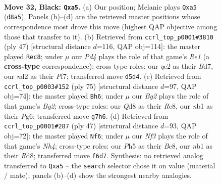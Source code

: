 \documentclass[11pt]{article}
\begin{document}
\clearpage

\begin{figure}[p]\centering
\begin{subfigure}{0.46\textwidth}\centering
\resizebox{\linewidth}{!}{%
\newchessgame
\chessboard[
  setfen={r1bq1r2/pp3pbk/n4np1/P2pP1Bp/B5PP/1P6/R1PNQP2/1N2R1K1 b - - 0 32},
  showmover=false,
  pgfstyle=straightmove, color=movearrow, markmove={d8-a5}
]}
\caption{}
\end{subfigure}\hfill
\begin{subfigure}{0.46\textwidth}\centering
\resizebox{\linewidth}{!}{%
\newchessgame
\chessboard[
  setfen={r3r1k1/3bqpp1/pb1p1n2/1p1P2B1/P1nNP2p/5P1P/2B1N1P1/R2Q1R1K b - - 1 24},
  showmover=false,
  pgfstyle=straightmove, color=movearrow, markmove={e8-c8}
]}
\caption{}
\end{subfigure}
\\[4pt]
\begin{subfigure}{0.46\textwidth}\centering
\resizebox{\linewidth}{!}{%
\newchessgame
\chessboard[
  setfen={r1r3k1/1p1bqpb1/3p1np1/pNnP3p/P1RN4/6PP/2Q1PPB1/1R2B1K1 b - - 9 38},
  showmover=false,
  pgfstyle=straightmove, color=movearrow, markmove={g7-h6}
]}
\caption{}
\end{subfigure}\hfill
\begin{subfigure}{0.46\textwidth}\centering
\resizebox{\linewidth}{!}{%
\newchessgame
\chessboard[
  setfen={2br1r1k/2p1b1pp/7q/p1P1pP1n/1p3nP1/4BN1P/PPQN1P1K/R4B1R b - - 0 24},
  showmover=false,
  pgfstyle=straightmove, color=movearrow, markmove={h5-f6}
]}
\caption{}
\end{subfigure}
\caption{\textbf{Move 32, Black: \texttt{Qxa5}.} (a) Our position; Melanie plays \texttt{Qxa5} (\texttt{d8a5}). Panels (b)--(d) are the retrieved master positions whose correspondence most drove this move (highest QAP objective among those that transfer to it). (b) Retrieved from \texttt{ccrl\_top\_p0001\#3810} (ply 47) [structural distance $d$=116, QAP obj=114]: the master played \texttt{Rec8}; under $\mu$ our \emph{Pd4} plays the role of that game's \emph{Re1} (a \textbf{cross-type} correspondence); cross-type roles: our \emph{q}e2 as their \emph{B}d7, our \emph{n}d2 as their \emph{P}f7; transferred move \texttt{d5d4}. (c) Retrieved from \texttt{ccrl\_top\_p0003\#152} (ply 75) [structural distance $d$=97, QAP obj=74]: the master played \texttt{Bh6}; under $\mu$ our \emph{Bg2} plays the role of that game's \emph{Bg2}; cross-type roles: our \emph{Q}d8 as their \emph{R}c8, our \emph{n}b1 as their \emph{P}g6; transferred move \texttt{g7h6}. (d) Retrieved from \texttt{ccrl\_top\_p0001\#287} (ply 47) [structural distance $d$=93, QAP obj=72]: the master played \texttt{Nf6}; under $\mu$ our \emph{Nf3} plays the role of that game's \emph{Nh4}; cross-type roles: our \emph{P}h5 as their \emph{B}c8, our \emph{n}b1 as their \emph{R}d8; transferred move \texttt{f6d7}. Synthesis: no retrieved analog transferred to \texttt{Qxa5} -- the \texttt{search} selector chose it on value (material / mate); panels (b)--(d) show the strongest nearby analogies.}
\label{fig:thought-m63}
\end{figure}
\end{document}
